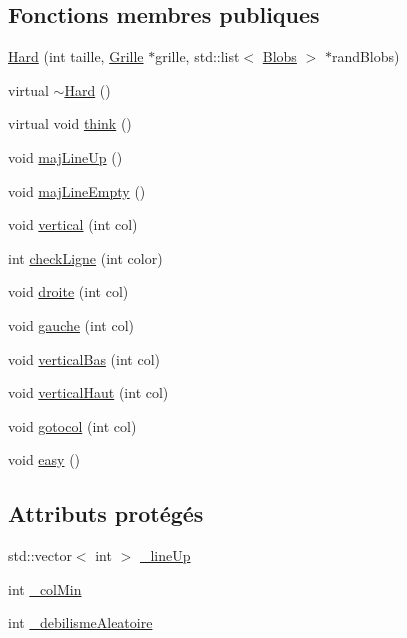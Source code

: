 \subsection*{Fonctions membres publiques}
\begin{DoxyCompactItemize}
\item 
\hyperlink{a00010_ab4e64cf125abac5d134a54aacc2b185f}{Hard} (int taille, \hyperlink{a00009}{Grille} $\ast$grille, std::list$<$ \hyperlink{a00002}{Blobs} $>$ $\ast$randBlobs)
\item 
virtual \hyperlink{a00010_a923689eba65bc738bc51b35950e30287}{$\sim$Hard} ()
\item 
virtual void \hyperlink{a00010_aef0c09a1c1830583d0fdd60ce6273247}{think} ()
\item 
void \hyperlink{a00010_a2ef5d60b9f599447a8f9b97433e26c64}{majLineUp} ()
\item 
void \hyperlink{a00010_adb65c7409eac21ee72cca6a5a18f009b}{majLineEmpty} ()
\item 
void \hyperlink{a00010_a44d66c2111608f15555553ac342d1915}{vertical} (int col)
\item 
int \hyperlink{a00010_a9f437c2157f0d7f584cc8b80b098644c}{checkLigne} (int color)
\item 
void \hyperlink{a00010_a6fac737ec1b166b740ca5b837dceec64}{droite} (int col)
\item 
void \hyperlink{a00010_a7f9949755fd2f0f4f00ac905b5e01113}{gauche} (int col)
\item 
void \hyperlink{a00010_a30c0f8f6b7089ad3a445ab4d73475ad0}{verticalBas} (int col)
\item 
void \hyperlink{a00010_aa3923fb9a7cd12294b8dea3db7a07053}{verticalHaut} (int col)
\item 
void \hyperlink{a00010_a1b8904c208b5126198f8a0ae1660ba42}{gotocol} (int col)
\item 
void \hyperlink{a00010_a91ef94a0415b7244a326f4fed5d41470}{easy} ()
\end{DoxyCompactItemize}
\subsection*{Attributs protégés}
\begin{DoxyCompactItemize}
\item 
std::vector$<$ int $>$ \hyperlink{a00010_a77f3d26a1e2b3c98e8e0ec513fc57112}{\_\-lineUp}
\item 
int \hyperlink{a00010_a5e05a5d847e4543162fd7ba5ebbce233}{\_\-colMin}
\item 
int \hyperlink{a00010_a40a101537ee79d41b6e7b4f78986050d}{\_\-debilismeAleatoire}
\end{DoxyCompactItemize}


